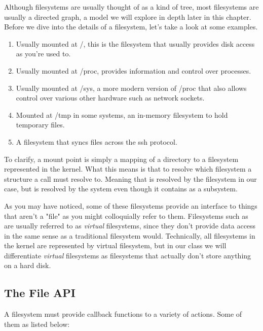 Although filesystems are usually thought of as a kind of tree, most filesystems are usually a directed graph, a model we will explore in depth later in this chapter. Before we dive into the details of a filesystem, let's take a look at some examples.

\begin{enumerate}

  \item {} Usually mounted at /, this is the filesystem that usually provides disk access as you're used to.
  \item {} Usually mounted at /proc, provides information and control over processes.
  \item {} Usually mounted at /sys, a more modern version of /proc that also allows control over various other hardware such as network sockets.
  \item {} Mounted at /tmp in some systems, an in-memory filesystem to hold temporary files.
  \item {} A filesystem that syncs files across the ssh protocol.

\end{enumerate}

To clarify, a mount point is simply a mapping of a directory to a filesystem represented in the kernel. What this means is that to resolve which filesystem a structure a call must resolve to. Meaning that  is resolved by the  filesystem in our case, but  is resolved by the  system even though it contains \keyword{/} as a subsystem.

As you may have noticed, some of these filesystems provide an interface to things that aren't a "file" as you might colloquially refer to them. Filesystems such as  are usually referred to as \emph{virtual} filesystems, since they don't provide data access in the same sense as a traditional filesystem would. Technically, all filesystems in the kernel are represented by virtual filesystem, but in our class we will differentiate \emph{virtual} filesystems as filesystems that actually don't store anything on a hard disk.

\subsection{The File API}

A filesystem must provide callback functions to a variety of actions. Some of them as listed below:

